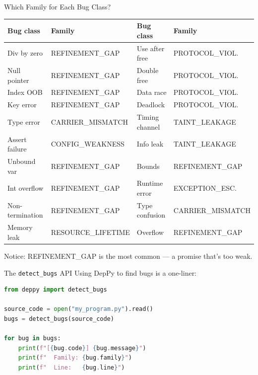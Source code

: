 \documentclass[aspectratio=169,10pt]{beamer}
\begin{document}
\begin{frame}{Which Family for Each Bug Class?}
{\scriptsize
\begin{tabular}{@{}ll@{\hspace{1em}}ll@{}}
\textbf{Bug class} & \textbf{Family} & \textbf{Bug class} & \textbf{Family} \\
\hline
Div by zero       & REFINEMENT\_GAP     & Use after free   & PROTOCOL\_VIOL.\\
Null pointer      & REFINEMENT\_GAP     & Double free      & PROTOCOL\_VIOL.\\
Index OOB         & REFINEMENT\_GAP     & Data race        & PROTOCOL\_VIOL.\\
Key error         & REFINEMENT\_GAP     & Deadlock         & PROTOCOL\_VIOL.\\
Type error        & CARRIER\_MISMATCH   & Timing channel   & TAINT\_LEAKAGE\\
Assert failure    & CONFIG\_WEAKNESS    & Info leak        & TAINT\_LEAKAGE\\
Unbound var       & REFINEMENT\_GAP     & Bounds           & REFINEMENT\_GAP\\
Int overflow      & REFINEMENT\_GAP     & Runtime error    & EXCEPTION\_ESC.\\
Non-termination   & REFINEMENT\_GAP     & Type confusion   & CARRIER\_MISMATCH\\
Memory leak       & RESOURCE\_LIFETIME  & Overflow         & REFINEMENT\_GAP\\
\end{tabular}}
\vspace{0.3em}
Notice: REFINEMENT\_GAP is the most common --- a promise that's too weak.
\end{frame}

\begin{frame}[fragile]{The \texttt{detect\_bugs} API}
Using DepPy to find bugs is a one-liner:
\vspace{0.3em}
\begin{lstlisting}[language=Python, basicstyle=\ttfamily\scriptsize]
from deppy import detect_bugs

source_code = open("my_program.py").read()
bugs = detect_bugs(source_code)

for bug in bugs:
    print(f"[{bug.code}] {bug.message}")
    print(f"  Family: {bug.family}")
    print(f"  Line:   {bug.line}")
\end{lstlisting}
\end{frame}
\end{document}
